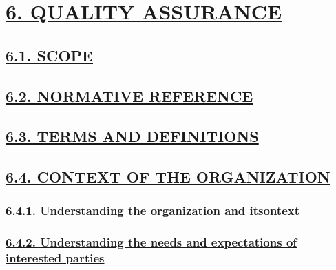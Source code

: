 \documentclass[
]{article}
\begin{document}
\hypertarget{quality-assurance}{%
\section{\texorpdfstring{\protect\hyperlink{quality-assurance-1}{6.
QUALITY ASSURANCE}}{6. QUALITY ASSURANCE}}\label{quality-assurance}}

\hypertarget{scope}{%
\subsection{\texorpdfstring{\protect\hyperlink{scope-1}{6.1.
SCOPE}}{6.1. SCOPE}}\label{scope}}

\hypertarget{normative-reference}{%
\subsection{\texorpdfstring{\protect\hyperlink{normative-reference-1}{6.2.
NORMATIVE
REFERENCE}}{6.2. NORMATIVE REFERENCE}}\label{normative-reference}}

\hypertarget{terms-and-definitions}{%
\subsection{\texorpdfstring{\protect\hyperlink{terms-and-definitions-1}{6.3.
TERMS AND
DEFINITIONS}}{6.3. TERMS AND DEFINITIONS}}\label{terms-and-definitions}}

\hypertarget{context-of-the-organization}{%
\subsection{\texorpdfstring{\protect\hyperlink{context-of-the-organization-1}{6.4.
CONTEXT OF THE
ORGANIZATION}}{6.4. CONTEXT OF THE ORGANIZATION}}\label{context-of-the-organization}}

\hypertarget{understanding-the-organization-and-itsontext}{%
\subsubsection{\texorpdfstring{\protect\hyperlink{understanding-the-organization-and-itsontext-1}{6.4.1.
Understanding the organization and
itsontext}}{6.4.1. Understanding the organization and itsontext}}\label{understanding-the-organization-and-itsontext}}

\hypertarget{understanding-the-needs-and-expectations-of-interested-parties}{%
\subsubsection{\texorpdfstring{\protect\hyperlink{understanding-the-needs-and-expectations-of-interested-parties-1}{6.4.2.
Understanding the needs and expectations of interested
parties}}{6.4.2. Understanding the needs and expectations of interested parties}}\label{understanding-the-needs-and-expectations-of-interested-parties}}
\end{document}
